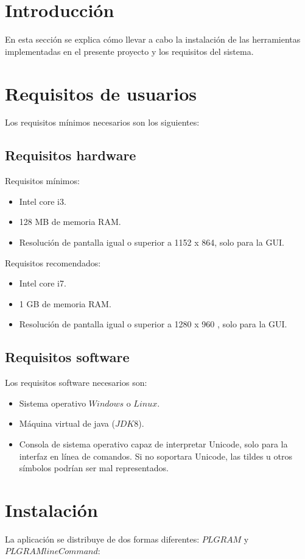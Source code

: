
\section{Introducción}
En esta sección se explica cómo llevar a cabo la instalación de las herramientas implementadas en el presente proyecto y los requisitos del sistema.
\section{Requisitos de usuarios}
Los requisitos mínimos necesarios son los siguientes:
\subsection{Requisitos hardware}
Requisitos mínimos:
\begin{itemize}
\item Intel core i3.
\item 128 MB  de memoria RAM.
\item Resolución de pantalla igual o superior a 1152 x 864, solo para la GUI.
\end{itemize}

Requisitos recomendados:

\begin{itemize}

\item Intel core i7.
\item 1 GB de memoria RAM.
\item Resolución de pantalla igual o superior a 1280 x 960 , solo para la GUI.
\end{itemize}

\subsection{Requisitos software}

Los requisitos software necesarios son:
\begin{itemize}
\item Sistema operativo $Windows$ o $Linux$.
\item Máquina virtual de java ($JDK 8$).
\item Consola de sistema operativo capaz de interpretar Unicode, solo para la interfaz en línea de comandos. Si no soportara Unicode, las tildes u otros símbolos podrían ser mal representados.
\end{itemize}
\section{Instalación}
La aplicación se distribuye de dos formas diferentes: $PLGRAM$ y $PLGRAMlineCommand$:

